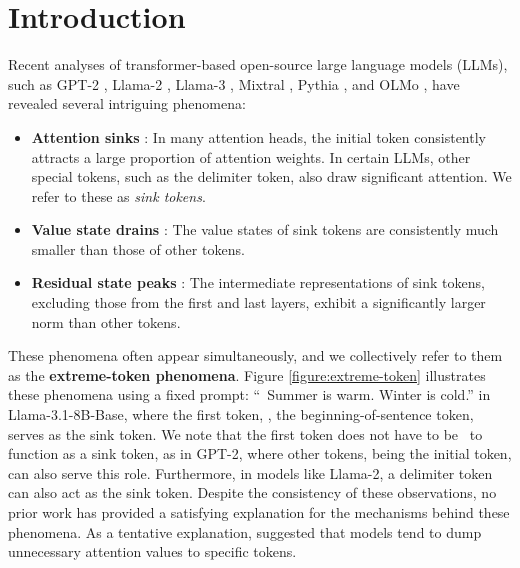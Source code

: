 \section{Introduction}

Recent analyses of transformer-based open-source large language models (LLMs), such as GPT-2 \citep{radford2019language}, Llama-2 \citep{touvron2023llama}, Llama-3 \citep{dubey2024llama}, Mixtral \citep{jiang2023mistral}, Pythia \citep{biderman2023pythia}, and OLMo \citep{groeneveld2024olmo}, have revealed several intriguing phenomena: 
\begin{itemize}[leftmargin=2em]
\setlength\itemsep{0pt}
\item \textbf{Attention sinks} \citep{xiao2023efficient}: In many attention heads, the initial token consistently attracts a large proportion of attention weights. In certain LLMs, other special tokens, such as the delimiter token, also draw significant attention. We refer to these as \textit{sink tokens}. 
\item \textbf{Value state drains} \citep{guo2024attention}: The value states of sink tokens are consistently much smaller than those of other tokens. 
\item \textbf{Residual state peaks} \citep{sun2024massive}: The intermediate representations of sink tokens, excluding those from the first and last layers, exhibit a significantly larger norm than other tokens.
\end{itemize}
These phenomena often appear simultaneously, and we collectively refer to them as the \textbf{extreme-token phenomena}. Figure \ref{figure:extreme-token} illustrates these phenomena using a fixed prompt: ``\bos~Summer is warm. Winter is cold.'' in Llama-3.1-8B-Base, where the first token, \bos, the beginning-of-sentence token, serves as the sink token. We note that the first token does not have to be \bos~to function as a sink token, as in GPT-2, where other tokens, being the initial token, can also serve this role. Furthermore, in models like Llama-2, a delimiter token can also act as the sink token. Despite the consistency of these observations, no prior work has provided a satisfying explanation for the mechanisms behind these phenomena. As a tentative explanation, \citet{xiao2023efficient} suggested that models tend to dump unnecessary attention values to specific tokens. 

